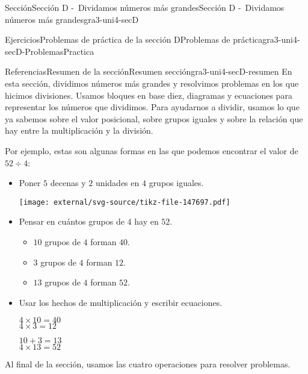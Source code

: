 \documentclass[twoside,14pt,]{extarticle}
\begin{document}
\begin{sectionptx}{Sección}{Sección D -~Dividamos números más grandes}{}{Sección D -~Dividamos números más grandes}{}{}{gra3-uni4-secD}
\begin{exercises-subsection}{Ejercicios}{Problemas de práctica de la sección D}{}{Problemas de práctica}{}{}{gra3-uni4-secD-ProblemasPractica}
\end{exercises-subsection}
%
%
\typeout{************************************************}
\typeout{************************************************}
%
\begin{references-subsection}{Referencias}{Resumen de la sección}{}{Resumen sección}{}{}{gra3-uni4-secD-resumen}
En esta sección, dividimos números más grandes y resolvimos problemas en los que hicimos divisiones. Usamos bloques en base diez, diagramas y ecuaciones para representar los números que dividimos. Para ayudarnos a dividir, usamos lo que ya sabemos sobre el valor posicional, sobre grupos iguales y sobre la relación que hay entre la multiplicación y la división.%
\par
Por ejemplo, estas son algunas formas en las que podemos encontrar el valor de \(52 \div 4\):%
%
\begin{itemize}[label=\textbullet]
\item{}Poner \(5\) decenas y \(2\) unidades en \(4\) grupos iguales.%
\begin{image}{0}{1}{0}{}%
\texttt{[image: external/svg-source/tikz-file-147697.pdf]}
\end{image}%
\item{}Pensar en cuántos grupos de \(4\) hay en \(52\).%
%
\begin{itemize}[label=$\circ$]
\item{}\(10\) grupos de \(4\) forman \(40\).%
\item{}\(3\) grupos de \(4\) forman \(12\).%
\item{}\(13\) grupos de \(4\) forman \(52\).%
\end{itemize}
\item{}Usar los hechos de multiplicación y escribir ecuaciones.%
\begin{sidebyside}{2}{0}{0.2}{0}%
\begin{sbspanel}{0.4}%
\(4 \times 10 = 40\)\\
 \(4 \times 3 = 12\)%
\end{sbspanel}%
\begin{sbspanel}{0.4}%
\par
\(10 + 3 = 13\)\\
 \(4 \times 13 = 52\)%
\end{sbspanel}%
\end{sidebyside}%
\end{itemize}
Al final de la sección, usamos las cuatro operaciones para resolver problemas.%
\end{references-subsection}
\end{sectionptx}
\end{document}
